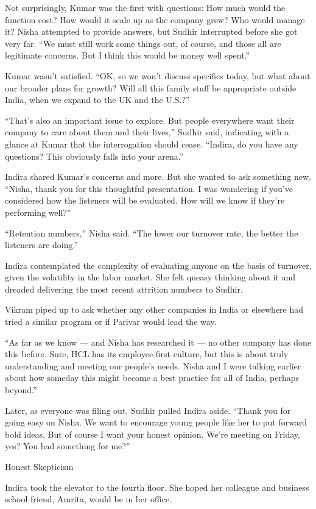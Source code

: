 \documentclass[10pt,a4paper]{book}
\begin{document}
\begin{multicols}{3}
{Not surprisingly, Kumar was the first with questions: How much would the function cost? How would it scale up as the company grew? Who would manage it? Nisha attempted to provide answers, but Sudhir interrupted before she got very far. “We must still work some things out, of course, and those all are legitimate concerns. But I think this would be money well spent.”

Kumar wasn’t satisfied. “OK, so we won’t discuss specifics today, but what about our broader plans for growth? Will all this family stuff be appropriate outside India, when we expand to the UK and the U.S.?”

“That’s also an important issue to explore. But people everywhere want their company to care about them and their lives,” Sudhir said, indicating with a glance at Kumar that the interrogation should cease. “Indira, do you have any questions? This obviously falls into your arena.”

Indira shared Kumar’s concerns and more. But she wanted to ask something new. “Nisha, thank you for this thoughtful presentation. I was wondering if you’ve considered how the listeners will be evaluated. How will we know if they’re performing well?”

“Retention numbers,” Nisha said. “The lower our turnover rate, the better the listeners are doing.”

Indira contemplated the complexity of evaluating anyone on the basis of turnover, given the volatility in the labor market. She felt queasy thinking about it and dreaded delivering the most recent attrition numbers to Sudhir.

Vikram piped up to ask whether any other companies in India or elsewhere had tried a similar program or if Parivar would lead the way.

“As far as we know — and Nisha has researched it — no other company has done this before. Sure, HCL has its employee-first culture, but this is about truly understanding and meeting our people’s needs. Nisha and I were talking earlier about how someday this might become a best practice for all of India, perhaps beyond.”

Later, as everyone was filing out, Sudhir pulled Indira aside. “Thank you for going easy on Nisha. We want to encourage young people like her to put forward bold ideas. But of course I want your honest opinion. We’re meeting on Friday, yes? You had something for me?”

Honest Skepticism

Indira took the elevator to the fourth floor. She hoped her colleague and business school friend, Amrita, would be in her office.

}
\end{multicols}
\end{document}
